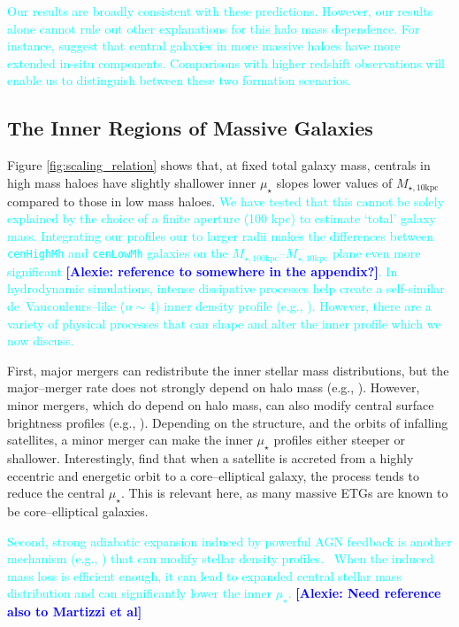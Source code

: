 \documentclass[a4paper,fleqn,usenatbib]{mnras}
\def\rbcg{\texttt{cenHighMh}}
\def\nbcg{\texttt{cenLowMh}}
\def\minn{{$M_{\star,10\mathrm{kpc}}$}}
\def\mtot{{$M_{\star,100\mathrm{kpc}}$}}
\def\mden{{$\mu_{\star}$}}
\newcommand{\song}[1]{\textcolor{cyan}{#1}}
\newcommand{\alexie}[1]{\textcolor{blue}{\textbf{[Alexie: #1]}}}
\begin{document}
    \song{
    Our results are broadly consistent with these predictions. However, our results alone cannot rule out other explanations for this halo mass dependence. For instance, \citet{Buchan2016} suggest that central galaxies in more massive haloes have more extended in-situ components. Comparisons with higher redshift observations will enable us to distinguish between these two formation scenarios.
    }
   
\subsection{The Inner Regions of Massive Galaxies}

Figure \ref{fig:scaling_relation} shows that, at fixed total galaxy mass, centrals in high mass haloes have slightly shallower inner \mden{} slopes lower values of \minn{} compared to those in low mass haloes. \song{We have tested that this cannot be solely explained by the choice of a finite aperture (100 kpc) to estimate `total' galaxy mass. Integrating our profiles our to larger radii makes the differences between \rbcg{} and \nbcg{} galaxies on the \mtot{}--\minn{} 
    plane even more significant \alexie{reference to somewhere in the appendix?}. In hydrodynamic simulations, intense dissipative processes help create a self-similar de~Vaucouleurs--like ($n{\sim} 4$) inner density profile (e.g., \citealt{Hopkins2008}). However, there are a variety of physical processes that can shape and alter the inner  profile which we now discuss.
    } 
    
    First, major mergers can redistribute the inner stellar mass distributions, but 
    the major--merger rate does not strongly depend on halo mass 
    (e.g., \citealt{Shankar2014}). 
    However, minor mergers, which do depend on halo mass, can also modify central 
    surface brightness profiles (e.g., \citealt{BoylanKolchin2007}). 
    Depending on the structure, and the orbits of infalling satellites, a minor merger 
    can make the inner \mden{} profiles either steeper or shallower.  
    Interestingly, \citet{BoylanKolchin2007} find that when a satellite is accreted 
    from a highly eccentric and energetic orbit to a core--elliptical galaxy, the 
    process tends to reduce the central \mden{}.  
    This is relevant here, as many massive ETGs are known to be core--elliptical 
    galaxies. 
    
    \song{Second, strong adiabatic expansion induced by powerful AGN feedback is another mechanism 
    (e.g., \citealt{Fan2008}) that can modify stellar density profiles. \
    When the induced mass loss is efficient enough, it can lead to expanded 
    central stellar mass distribution and can significantly lower the inner \mden{}. 
    } \alexie{Need reference also to Martizzi et al}
    
\end{document}
